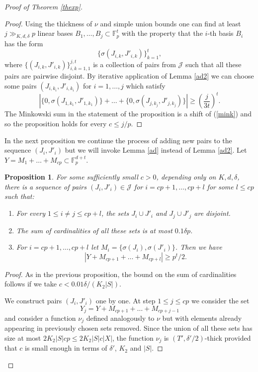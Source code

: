 \documentclass{daj}
\renewcommand{\le}{\leqslant}
\renewcommand{\ge}{\geqslant}
\newcommand{\FF}{\mathbb F}
\newcommand{\J}{\mathcal J}
\newtheorem{prop}[theorem]{Proposition}
\theoremstyle{definition}
\theoremstyle{remark}
\theoremstyle{definition}
\theoremstyle{definition}
\begin{document}
\begin{proof}[Proof of Theorem \ref{thexp}]
\begin{proof}
Using the thickness of $\nu$ and simple union bounds one can find at least $j \gg_{K, d, \delta} p$ linear bases $B_1, \ldots, B_j \subset \FF_p^t$ with the property that the $i$-th basis $B_i$ has the form 
$$
\{ \sigma(J_{i, k}, J'_{i, k}) \}_{k = 1}^t,
$$ 
where $\{(J_{i, k}, J'_{i, k})\}_{i, k = 1, 1}^{j, t}$ is a collection of pairs from $\J$ such that all these pairs are pairwise disjoint. 
By iterative application of Lemma \ref{ad2} we can choose some pairs $(J_{i, k_i}, J'_{i, k_i})$ for $i = 1, \ldots, j$ which satisfy 
\begin{equation}\label{mink}
| \{0, \sigma(J_{1, k_1}, J'_{1, k_1})\} + \ldots + \{0, \sigma(J_{j, k_j}, J'_{j, k_j})\} | \ge \left (  \frac{j}{3t} \right)^t.     
\end{equation}
The Minkowski sum in the statement of the proposition is a shift of (\ref{mink}) and so the proposition holds for every $c \le j/p$.
\end{proof}

In the next proposition we continue the process of adding new pairs to the sequence $(J_i, J'_i)$ but we will invoke Lemma \ref{ad} instead of Lemma \ref{ad2}. Let $Y = M_1 + \ldots + M_{cp} \subset \FF_p^{d+t}$.

\begin{prop}\label{adp2}
For some sufficiently small $c>0$, depending only on $K,d,\delta$, there is a sequence of pairs $(J_i, J'_i) \in \J$ for $i = cp+1, \ldots, cp+l$ for some $l \le cp$ such that:
\begin{enumerate}
    \item For every $1 \le i \neq j \le cp+l$, the sets $J_i \cup J'_i$ and $J_j \cup J'_j$ are disjoint.
    \item The sum of cardinalities of all these sets is at most $0.1 \delta p$.
    \item For $i = cp+1, \ldots, cp+l$ let $M_i = \{ \sigma(J_i), \sigma(J'_i) \}$. Then we have 
\begin{equation}\label{eq4}
    |Y + M_{cp+1} + \ldots + M_{cp+l}| \ge p^t / 2.
\end{equation}
\end{enumerate}
\end{prop}

\begin{proof}
As in the previous proposition, the bound on the sum of cardinalities follows if we take $c < 0.01 \delta /(K_2 |S|)$.

We construct pairs $(J_i, J'_i)$ one by one. At step $1\le j \le cp$ we consider the set 
$$
Y_j = Y + M_{cp+1} + \ldots + M_{cp+j-1}
$$
and consider a function $\nu_j$ defined analogously to $\nu$ but with elements already appearing in previously chosen sets removed. Since the union of all these sets has size at most $ 2K_2 |S| c p \le 2K_2 |S| c |X|$, the function $\nu_j$ is $(T', \delta'/2)$-thick provided that $c$ is small enough in terms of $\delta'$, $K_2$ and $|S|$. 


\end{proof}
\end{proof}
\end{document}
